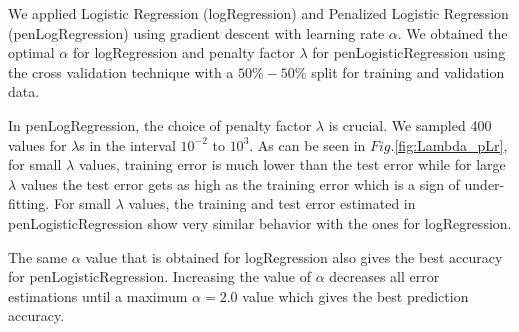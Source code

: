 We applied Logistic Regression (logRegression) and Penalized Logistic Regression (penLogRegression) using gradient descent with learning rate $\alpha$.  We obtained the optimal $\alpha$ for logRegression   and penalty factor $\lambda$ for penLogisticRegression using the cross validation technique with a $50\%-50\%$ split for training and validation data.

In penLogRegression, the choice of penalty factor $\lambda$ is crucial.  We sampled 400 values for $\lambda$s in the interval  $10^{-2}$ to $10^3$. As can be seen in $Fig.$\ref{fig:Lambda_pLr}, for small $\lambda$ values, training error is much lower than the test error while for large $\lambda$ values the test error gets as high as the training error which is a sign of under-fitting. 
For small $\lambda$ values, the training and test error estimated in penLogisticRegression show very similar behavior with the ones for logRegression. 

The same $\alpha$ value that is obtained for logRegression  also gives the best accuracy for penLogisticRegression. Increasing the value of $\alpha$ decreases all error estimations until a maximum $\alpha=2.0$ value which gives the best prediction accuracy.


